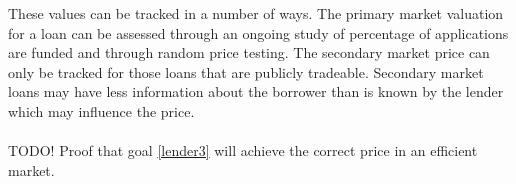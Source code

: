 \documentclass{article}
\theoremstyle{definition}
\begin{document}
These values can be tracked in a number of ways.  The primary market valuation for a loan can be assessed through an ongoing study of percentage of applications are funded and through random price testing.  The secondary market price can only be tracked for those loans that are publicly tradeable.  Secondary market loans may have less information about the borrower than is known by the lender which may influence the price.  
\\
\\
TODO! Proof that goal \ref{lender3} will achieve the correct price in an efficient market.  
\end{document}
